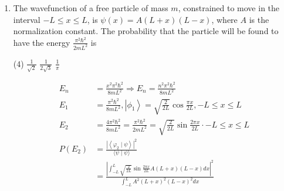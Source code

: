 \begin{enumerate}
 \begin{tasks}(4)
	\task[\textbf{a.}]$\frac{3 \pi^{2} \hbar^{2}}{8 m L^{2}}$
	\task[\textbf{b.}]$\frac{\pi^{2} \hbar^{2}}{8 m L^{2}}$
	\task[\textbf{c.}] $\frac{\pi^{2} \hbar^{2}}{2 m L^{2}}$
\end{tasks}
\begin{answer}
	\begin{align*}
	\text{Initial particle in ground state}\\
	E_{i}&=\frac{\pi^{2} \hbar^{2}}{2 m\left(2 L^{2}\right)}=\frac{\pi^{2} \hbar^{2}}{8 m L^{2}}
	\intertext{here the wall is introduced. Slowly the particle will in ground state at new wall with width }
	L E_{f}&=\frac{\pi^{2} \hbar^{2}}{2 m L^{2}}\\
	\Delta W&=E_{f}-E_{i}=\frac{\pi^{2} \hbar^{2}}{2 m L^{2}}-\frac{\pi^{2} \hbar^{2}}{8 m L^{2}}=\frac{3 \pi^{2} \hbar^{2}}{8 m L^{2}}
	\end{align*}
		So the correct answer is \textbf{Option (a)}
\end{answer}
\item  The wavefunction of a free particle of mass $m$, constrained to move in the interval $-L \leq x \leq L$, is $\psi(x)=A(L+x)(L-x)$, where $A$ is the normalization constant. The probability that the particle will be found to have the energy $\frac{\pi^{2} \hbar^{2}}{2 m L^{2}}$ is
 \begin{tasks}(4)
	\task[\textbf{b.}]$\frac{1}{\sqrt{2}}$
	\task[\textbf{c.}]$\frac{1}{2 \sqrt{3}}$
	\task[\textbf{d.}] $\frac{1}{\pi}$ 
\end{tasks}
\begin{answer}
	\begin{align*}
	E_{n}&=\frac{x^{2} \pi^{2} \hbar^{2}}{8 m L^{2}} \Rightarrow E_{n}=\frac{n^{2} \pi^{2} \hbar^{2}}{8 m L^{2}}\\
	E_{1}&=\frac{\pi^{2} \hbar^{2}}{8 m L^{2}},\left|\phi_{1}\right\rangle=\sqrt{\frac{2}{2 L}} \cos \frac{\pi x}{2 L},-L \leq x \leq L \\
	E_{2}&=\frac{4 \pi^{2} \hbar^{2}}{8 m L^{2}}=\frac{\pi^{2} \hbar^{2}}{2 m L^{2}}=\sqrt{\frac{2}{2 L}} \sin \frac{2 \pi x}{2 L} \cdot-L \leq x \leq L \\
	P\left(E_{2}\right)&=\frac{\left|\left\langle\varphi_{2} \mid \psi\right\rangle\right|^{2}}{\langle\psi \mid \psi\rangle}\\
	&=\frac{\left|\int_{-L}^{L} \sqrt{\frac{2}{2 L}} \sin \frac{2 \pi x}{2 L} A(L+x)(L-x) d x\right|^{2}}{\int_{-L}^{L} A^{2}(L+x)^{2}(L-x)^{2} d x} \\

\end{align*}
\end{answer}
\end{enumerate}
